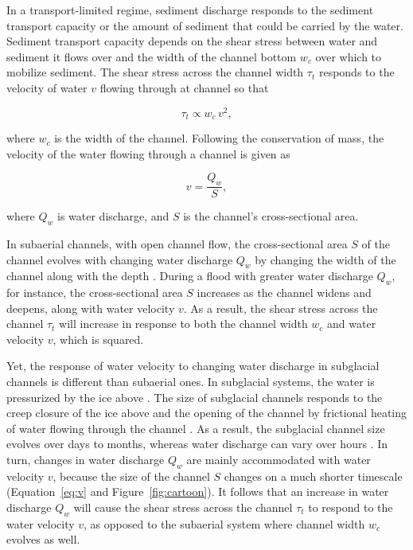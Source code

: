 \documentclass[11pt]{article}
\begin{document}
In a transport-limited regime, sediment discharge responds to the sediment transport capacity or the amount of sediment that could be carried by the water. Sediment transport capacity depends on the shear stress between water and sediment it flows  over \citep{shields1936,meyer1948,engelund1967} and the width of the channel bottom $w_c$ over which to mobilize sediment. The shear stress  across the channel width $\tau_t$ responds to the velocity of water $v$ flowing through at channel so that 
\begin{linenomath*}
  \begin{equation}
    \label{eq:tau_t}
    \tau_t \propto w_c\, v^2,
  \end{equation}
\end{linenomath*}
% 
where $w_c$ is the width of the channel.
Following the conservation of mass, the velocity of the water flowing through a  channel is given as 
\begin{linenomath*}
  \begin{equation}
    \label{eq:v}
    v = \frac{Q_w}{S},
  \end{equation}
\end{linenomath*}
% 
where $Q_w$ is water discharge,  and $S$ is the channel's cross-sectional area.

In subaerial channels, with open channel flow, the cross-sectional area $S$ of the channel evolves with changing water discharge $Q_w$  by changing the width of the channel along with the depth \citep{leopold1953}. During a flood with greater water discharge $Q_w$, for instance, the cross-sectional area $S$ increases as the channel widens and deepens, along with water velocity $v$. As a result, the shear stress across the channel $\tau_t$ will increase in response to both the channel width $w_c$  and water velocity $v$, which is squared. 

Yet, the response of water velocity to changing water discharge in subglacial channels is different than subaerial ones.
In subglacial systems, the water is pressurized by the ice above \citep{rothlisberger1972}.
The size of subglacial channels responds to the creep closure of the ice above and the opening of the channel by frictional heating of water flowing through the channel \citep{rothlisberger1972}.
As a result, the subglacial channel size evolves over days to months, whereas water discharge can vary over hours \citep[e.g.][]{iken1986,andrews2014,nanni2020}.
In turn, changes in water discharge $Q_w$ are mainly accommodated with water velocity $v$, because the size of the channel $S$ changes on a much shorter timescale (Equation~\ref{eq:v} and Figure~\ref{fig:cartoon}).
It follows that an increase in water discharge $Q_w$ will cause the shear stress across the channel $\tau_t$ to respond to the water velocity $v$, as opposed to the subaerial system where channel width $w_c$ evolves as well. 
\end{document}
